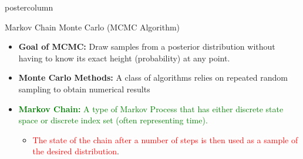 \documentclass[final]{beamer}\usepackage[]{graphicx}\usepackage[]{color}
\newcommand{\red}{\textcolor{red}}
\newcommand{\green}{\textcolor{green}}
\begin{document}
{\begin{frame}
\begin{columns}
\begin{column}{.33\textwidth}
\begin{beamercolorbox}[center,wd=\textwidth]{postercolumn}
\begin{minipage}[T]{.97\textwidth}
{%
\begin{block}{Markov Chain Monte Carlo (MCMC Algorithm)}
	
	
	\begin{itemize}
			\item \textbf{Goal of MCMC:} Draw samples from a posterior distribution without having to know its exact height (probability) at any point.
			\vspace{0.3cm}
		\item \textbf{Monte Carlo Methods:} A class of algorithms relies on repeated random sampling to obtain numerical results
		\vspace{0.3cm}
 		\item \green{\textbf{Markov Chain:} A type of Markov Process that has either discrete state space or discrete index set (often representing time).}

			\begin{itemize}
	  	\item	\red{The state of the chain after a number of steps is then used as a sample of the desired distribution}. 
		  \end{itemize}
		  \vspace{0.2cm}
		  
	 
	  
		  
		

\end{itemize}
\end{block}}
\end{minipage}
\end{beamercolorbox}
\end{column}
\end{columns}
\end{frame}}
\end{document}
